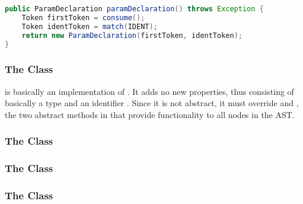 \begin{lstlisting}[language=Java,caption={},label={alg:param}]
public ParamDeclaration paramDeclaration() throws Exception {
	Token firstToken = consume();
	Token identToken = match(IDENT);
	return new ParamDeclaration(firstToken, identToken);
}
\end{lstlisting}

\subsubsection{The  Class}

 is basically an implementation of . It adds no new properties, thus consisting of basically a type  and an identifier . Since it is not abstract, it must override  and , the two abstract methods in  that provide functionality to all nodes in the AST.

\subsubsection{The  Class}

\subsubsection{The  Class}

\subsubsection{The  Class}
